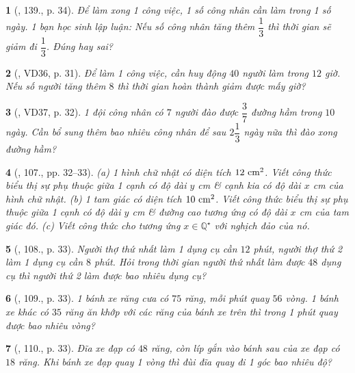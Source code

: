\documentclass{article}
\newtheorem{baitoan}{}
\begin{document}
\begin{baitoan}[\cite{Tuyen_Toan_7}, 139., p. 34]
	Để làm xong 1 công việc, 1 số công nhân cần làm trong 1 số ngày. 1 bạn học sinh lập luận: Nếu số công nhân tăng thêm $\dfrac{1}{3}$ thì thời gian sẽ giảm đi $\dfrac{1}{3}$. Đúng hay sai?
\end{baitoan}

\begin{baitoan}[\cite{Binh_Toan_7_tap_1}, VD36, p. 31]
	Để làm 1 công việc, cần huy động $40$ người làm trong $12$ giờ. Nếu số người tăng thêm $8$ thì thời gian hoàn thành giảm được mấy giờ?
\end{baitoan}

\begin{baitoan}[\cite{Binh_Toan_7_tap_1}, VD37, p. 32]
	1 đội công nhân có $7$ người đào được $\dfrac{3}{7}$ đường hầm trong $10$ ngày. Cần bổ sung thêm bao nhiêu công nhân để sau $2\dfrac{1}{3}$ ngày nữa thì đào xong đường hầm?
\end{baitoan}

\begin{baitoan}[\cite{Binh_Toan_7_tap_1}, 107., pp. 32--33]
	(a) 1 hình chữ nhật có diện tích $\rm12\ cm^2$. Viết công thức biểu thị sự phụ thuộc giữa 1 cạnh có độ dài $y$ {\rm cm} \& cạnh kia có độ dài $x$ {\rm cm} của hình chữ nhật. (b) 1 tam giác có diện tích $\rm10\ cm^2$. Viết công thức biểu thị sự phụ thuộc giữa 1 cạnh có độ dài $y$ {\rm cm} \& đường cao tương ứng có độ dài $x$ {\rm cm} của tam giác đó. (c) Viết công thức cho tương ứng $x\in\mathbb{Q}^\star$ với nghịch đảo của nó.
\end{baitoan}

\begin{baitoan}[\cite{Binh_Toan_7_tap_1}, 108., p. 33]
	Người thợ thứ nhất làm 1 dụng cụ cần $12$ phút, người thợ thứ 2 làm 1 dụng cụ cần $8$ phút. Hỏi trong thời gian người thứ nhất làm được $48$ dụng cụ thì người thứ 2 làm được bao nhiêu dụng cụ?
\end{baitoan}

\begin{baitoan}[\cite{Binh_Toan_7_tap_1}, 109., p. 33]
	1 bánh xe răng cưa có $75$ răng, mỗi phút quay $56$ vòng. 1 bánh xe khác có $35$ răng ăn khớp với các răng của bánh xe trên thì trong 1 phút quay được bao nhiêu vòng?
\end{baitoan}

\begin{baitoan}[\cite{Binh_Toan_7_tap_1}, 110., p. 33]
	Đĩa xe đạp có $48$ răng, còn líp gắn vào bánh sau của xe đạp có $18$ răng. Khi bánh xe đạp quay 1 vòng thì đùi đĩa quay đi 1 góc bao nhiêu độ?
\end{baitoan}
\end{document}
